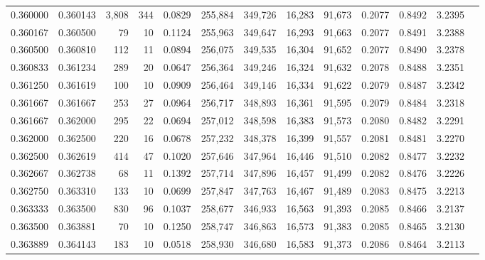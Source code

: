 \begin{tabular}{rrrrrrrrrrrrr}
0.360000 & 0.360143 & 3,808 & 344 &                                     0.0829 & 255,884 & 349,726 &  16,283 &  91,673 & 0.2077 & 0.8492 & 3.2395 \\
0.360167 & 0.360500 &    79 &  10 &                                     0.1124 & 255,963 & 349,647 &  16,293 &  91,663 & 0.2077 & 0.8491 & 3.2388 \\
0.360500 & 0.360810 &   112 &  11 &                                     0.0894 & 256,075 & 349,535 &  16,304 &  91,652 & 0.2077 & 0.8490 & 3.2378 \\
0.360833 & 0.361234 &   289 &  20 &                                     0.0647 & 256,364 & 349,246 &  16,324 &  91,632 & 0.2078 & 0.8488 & 3.2351 \\
0.361250 & 0.361619 &   100 &  10 &                                     0.0909 & 256,464 & 349,146 &  16,334 &  91,622 & 0.2079 & 0.8487 & 3.2342 \\
0.361667 & 0.361667 &   253 &  27 &                                     0.0964 & 256,717 & 348,893 &  16,361 &  91,595 & 0.2079 & 0.8484 & 3.2318 \\
0.361667 & 0.362000 &   295 &  22 &                                     0.0694 & 257,012 & 348,598 &  16,383 &  91,573 & 0.2080 & 0.8482 & 3.2291 \\
0.362000 & 0.362500 &   220 &  16 &                                     0.0678 & 257,232 & 348,378 &  16,399 &  91,557 & 0.2081 & 0.8481 & 3.2270 \\
0.362500 & 0.362619 &   414 &  47 &                                     0.1020 & 257,646 & 347,964 &  16,446 &  91,510 & 0.2082 & 0.8477 & 3.2232 \\
0.362667 & 0.362738 &    68 &  11 &                                     0.1392 & 257,714 & 347,896 &  16,457 &  91,499 & 0.2082 & 0.8476 & 3.2226 \\
0.362750 & 0.363310 &   133 &  10 &                                     0.0699 & 257,847 & 347,763 &  16,467 &  91,489 & 0.2083 & 0.8475 & 3.2213 \\
0.363333 & 0.363500 &   830 &  96 &                                     0.1037 & 258,677 & 346,933 &  16,563 &  91,393 & 0.2085 & 0.8466 & 3.2137 \\
0.363500 & 0.363881 &    70 &  10 &                                     0.1250 & 258,747 & 346,863 &  16,573 &  91,383 & 0.2085 & 0.8465 & 3.2130 \\
0.363889 & 0.364143 &   183 &  10 &                                     0.0518 & 258,930 & 346,680 &  16,583 &  91,373 & 0.2086 & 0.8464 & 3.2113 \\

\end{tabular}
